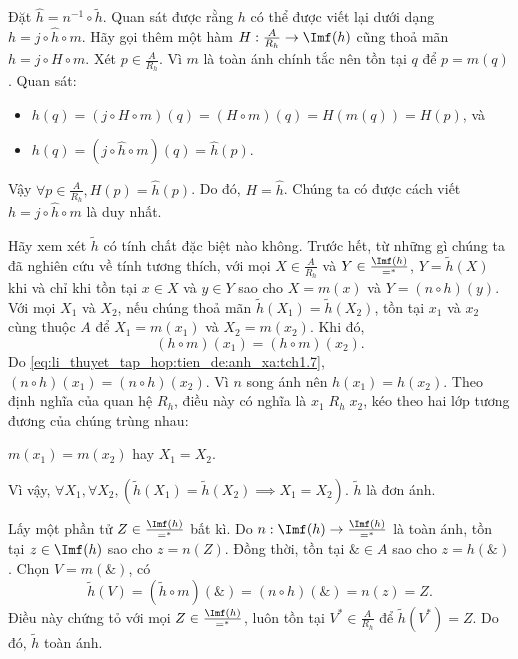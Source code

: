 Đặt $\hat{h} = n^{-1} \circ \tilde{h}$. Quan sát được rằng $h$ có thể được viết lại dưới dạng $h = j \circ \hat{h} \circ m$. Hãy gọi thêm một hàm $H: \frac{A}{R_h} \to \Imf(h)$ cũng thoả mãn $h = j \circ H \circ m$. Xét $p \in \frac{A}{R_h}$. Vì $m$ là toàn ánh chính tắc nên tồn tại $q$ để $p = m(q)$. Quan sát:
\begin{itemize}
   \item $h(q) = (j \circ H \circ m)(q) = (H \circ m)(q) = H(m(q)) = H(p)$, và
   \item $h(q) = (j \circ \hat{h} \circ m)(q) = \hat{h}(p)$.
\end{itemize}  
Vậy $\forall p \in \frac{A}{R_h}, H(p) = \hat{h}(p)$. Do đó, $H = \hat{h}$. Chúng ta có được cách viết $h = j \circ \hat{h} \circ m$ là duy nhất.

Hãy xem xét $\tilde{h}$ có tính chất đặc biệt nào không. Trước hết, từ những gì chúng ta đã nghiên cứu về tính tương thích, với mọi $X \in \frac A{R_h}$ và $Y \in \frac{\Imf(h)}{=^*}$, $Y = \tilde{h}(X)$ khi và chỉ khi tồn tại $x \in X$ và $y \in Y$ sao cho $X = m(x)$ và $Y = (n \circ h)(y)$. Với mọi $X_1$ và $X_2$, nếu chúng thoả mãn $\tilde{h}(X_1) = \tilde{h}(X_2)$, tồn tại $x_1$ và $x_2$ cùng thuộc $A$ để  $X_1 = m(x_1)$ và $X_2 = m(x_2)$. Khi đó, \begin{equation*}
   (h \circ m)(x_1) = (h \circ m)(x_2).
\end{equation*}
Do \eqref{eq:li_thuyet_tap_hop:tien_de:anh_xa:tch1.7}, $(n \circ h)(x_1) = (n \circ h)(x_2)$. Vì $n$ song ánh nên $h(x_1) = h(x_2)$. Theo định nghĩa của quan hệ $R_h$, điều này có nghĩa là $x_1\;R_h\;x_2$, kéo theo hai lớp tương đương của chúng trùng nhau:
\begin{center}
   $m(x_1) = m(x_2)$ hay $X_1 = X_2$.
\end{center}
Vì vậy, $\forall X_1, \forall X_2, \left(\tilde{h}(X_1) = \tilde{h}(X_2) \implies X_1 = X_2\right)$. $\tilde{h}$ là đơn ánh.

Lấy một phần tử $Z \in \frac{\Imf(h)}{=^*}$ bất kì. Do $n: \Imf(h) \to \frac{\Imf(h)}{=^*}$ là toàn ánh, tồn tại $z \in \Imf(h)$ sao cho $z = n(Z)$. Đồng thời, tồn tại $\& \in A$ sao cho $z = h(\&)$. Chọn $V = m(\&)$, có
\begin{equation*}
   \tilde{h}(V) = (\tilde{h} \circ m)(\&) = (n \circ h)(\&) = n(z) = Z.
\end{equation*}
Điều này chứng tỏ với mọi $Z \in \frac{\Imf(h)}{=^*}$, luôn tồn tại $V^* \in \frac{A}{R_h}$ để $\tilde{h}(V^*) = Z$. Do đó, $\tilde{h}$ toàn ánh.

